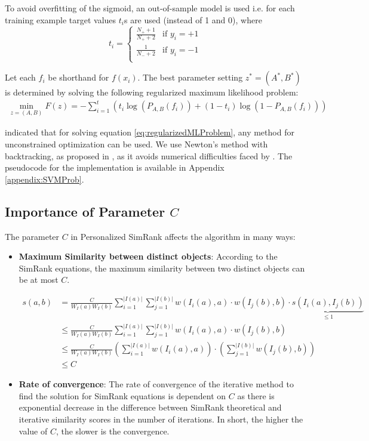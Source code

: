 To avoid overfitting of the sigmoid, an out-of-sample model is used i.e. for each training example target values $t_i$s are used (instead of 1 and 0), where 
\begin{equation} \label{eq:SVMTargetValues}
t_i =
\left\{ \begin{array}{rl}
\frac{N_+ +1}{N_+ +2} & \mbox{if } y_i = +1\\
\frac{1}{N_- +2} & \mbox{if } y_i = -1\\
\end{array}\right.
\end{equation}

Let each $f_i$ be shorthand for $f(x_i)$. 
The best parameter setting $z^{\ast} = (A^{\ast},B^{\ast})$ is determined by solving the following regularized maximum likelihood problem:
\begin{align} \label{eq:regularizedMLProblem}
\displaystyle \min_{z=(A,B)} F(z) = - \sum_{i=1}^{t}\left( t_i \log(P_{A,B}(f_i)) + (1-t_i)\log(1-P_{A,B}(f_i))\right)
\end{align}

\citep{Platt99} indicated that for solving equation \ref{eq:regularizedMLProblem}, any method for unconstrained optimization can be used. We use Newton's method with backtracking, as proposed in \citep{Lin03Note}, as it avoids numerical difficulties faced by \citep{Platt99}. The pseudocode for the implementation is available in Appendix \ref{appendix:SVMProb}.

\subsection{Importance of Parameter \texorpdfstring{$C$}{TEXT} }
The parameter $C$ in Personalized SimRank affects the algorithm in many ways:
\begin{itemize}
\item \textbf{Maximum Similarity between distinct objects}: According to the SimRank equations, the maximum similarity between two distinct objects can be at most $C$.

\begin{align}
s(a,b) &= \frac{C}{W_{I}(a)W_{I}(b)} \sum_{i=1}^{|I(a)|} \sum_{j=1}^{|I(b)|} w(I_i(a),a)  \cdot w(I_j(b),b) \cdot \underbrace{s(I_i(a),I_j(b))}_{\leq 1}\\
&\leq \frac{C}{W_{I}(a)W_{I}(b)} \sum_{i=1}^{|I(a)|} \sum_{j=1}^{|I(b)|} w(I_i(a),a)  \cdot w(I_j(b),b)\\
&\leq \frac{C}{W_{I}(a)W_{I}(b)} \left( \sum_{i=1}^{|I(a)|} w(I_i(a),a) \right )  \cdot \left( \sum_{j=1}^{|I(b)|}  w(I_j(b),b) \right )\\
&\leq C
\end{align}

\item \textbf{Rate of convergence}: The rate of convergence of the iterative method to find the solution for SimRank equations is dependent on $C$ as there is exponential decrease in the difference between SimRank theoretical and iterative similarity scores in the number of iterations. In short, the higher the value of $C$, the slower is the convergence.
\end{itemize}

